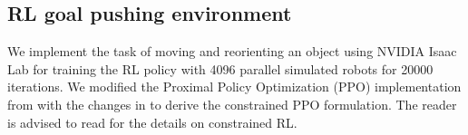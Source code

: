 
\subsection{RL goal pushing environment}
\label{sec:rl_environment}

We implement the task of moving and reorienting an object using NVIDIA Isaac Lab \cite{mittal2023orbit} for training the RL policy with 4096 parallel simulated robots for 20000 iterations. We modified the Proximal Policy Optimization (PPO) implementation from \cite{rudin2022learning} with the changes in \cite{chanesane2024cat} to derive the constrained PPO formulation. The reader is advised to read \cite{chanesane2024cat} for the details on constrained RL.


